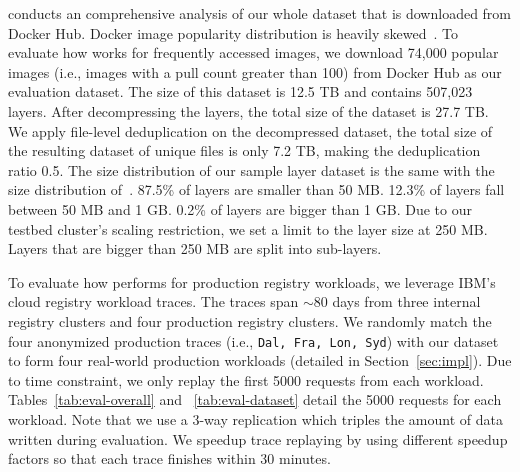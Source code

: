\cite{xxx} conducts an comprehensive analysis of our whole dataset that is downloaded from Docker Hub. 
Docker image popularity distribution is heavily skewed~\cite{analysisdockergithub}.
To evaluate how \sysname works for frequently accessed images, we download 74,000 popular images (i.e., images with a pull count greater than 100) from Docker Hub as our evaluation dataset. The size of this dataset is 12.5 TB and contains 507,023 layers. 
After decompressing the layers, the total size of the dataset is 27.7 TB.
We apply file-level deduplication on the decompressed dataset, the total size of the resulting dataset of unique files is only 7.2 TB, making the deduplication ratio 0.5.
The size distribution of our sample layer dataset is the same with the size distribution of~\cite{analysisdockergithub}.
87.5\% of layers are smaller than 50 MB.
12.3\% of layers fall between 50 MB and 1 GB.
0.2\% of layers are bigger than 1 GB.
Due to our testbed cluster's scaling restriction, we set a limit to the layer size %
at 250 MB. 
Layers that are bigger than 250 MB are split into sub-layers.
  
To evaluate how \sysname performs for production registry workloads, we leverage IBM's cloud registry workload traces\cite{dockerworkload}. 
The traces span $\sim$80 days from three internal registry clusters and four production registry clusters. 
We randomly match the four anonymized production traces (i.e., \texttt{Dal, Fra, Lon, Syd}) with our dataset to form four real-world production workloads (detailed in Section~\ref{sec:impl}). 
Due to time constraint, we only replay the first 5000 requests from each workload.
Tables~\ref{tab:eval-overall} and ~\ref{tab:eval-dataset} detail the 5000 requests for each workload.
Note that we use a 3-way replication
which triples the amount of data written during evaluation.
We speedup trace replaying by using different speedup factors so that each trace finishes within 30 minutes.




